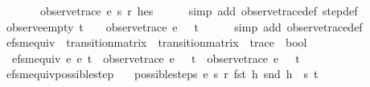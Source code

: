 \begin{isabellebody}
\ \ \ \ \ \ \ observe{\isacharunderscore}trace\ e\ s\ r\ {\isacharparenleft}h{\isacharhash}es{\isacharparenright}\ {\isacharequal}\ {\isacharbrackleft}{\isacharbrackright}{\isachardoublequoteclose}\isanewline
%
\isadelimproof
\ \ %
\endisadelimproof
%
\isatagproof
{}\isamarkupfalse%
\ {\isacharparenleft}simp\ add{\isacharcolon}\ observe{\isacharunderscore}trace{\isacharunderscore}def\ step{\isacharunderscore}def{\isacharparenright}%
\endisatagproof
{\isafoldproof}%
%
\isadelimproof
\isanewline
%
\endisadelimproof
\isanewline
{}\isamarkupfalse%
\ observe{\isacharunderscore}empty{\isacharcolon}\ {\isachardoublequoteopen}t\ {\isacharequal}\ {\isacharbrackleft}{\isacharbrackright}\ {\isasymLongrightarrow}\ observe{\isacharunderscore}trace\ e\ {}\ {\isacharless}{\isachargreater}\ t\ {\isacharequal}\ {\isacharbrackleft}{\isacharbrackright}{\isachardoublequoteclose}\isanewline
%
\isadelimproof
\ \ %
\endisadelimproof
%
\isatagproof
{}\isamarkupfalse%
\ {\isacharparenleft}simp\ add{\isacharcolon}\ observe{\isacharunderscore}trace{\isacharunderscore}def{\isacharparenright}%
\endisatagproof
{\isafoldproof}%
%
\isadelimproof
\isanewline
%
\endisadelimproof
\isanewline
{}\isamarkupfalse%
\ efsm{\isacharunderscore}equiv\ {\isacharcolon}{\isacharcolon}\ {\isachardoublequoteopen}transition{\isacharunderscore}matrix\ {\isasymRightarrow}\ transition{\isacharunderscore}matrix\ {\isasymRightarrow}\ trace\ {\isasymRightarrow}\ bool{\isachardoublequoteclose}\ \isanewline
\ \ {\isachardoublequoteopen}efsm{\isacharunderscore}equiv\ e{}\ e{}\ t\ {\isasymequiv}\ {\isacharparenleft}{\isacharparenleft}observe{\isacharunderscore}trace\ e{}\ {}\ {\isacharless}{\isachargreater}\ t{\isacharparenright}\ {\isacharequal}\ {\isacharparenleft}observe{\isacharunderscore}trace\ e{}\ {}\ {\isacharless}{\isachargreater}\ t{\isacharparenright}{\isacharparenright}{\isachardoublequoteclose}\isanewline
\isanewline
{}\isamarkupfalse%
\ efsm{\isacharunderscore}equiv{\isacharunderscore}possible{\isacharunderscore}step{\isacharcolon}\ \isanewline
\ \ {\isachardoublequoteopen}possible{\isacharunderscore}steps\ e{}\ s{}\ r{}\ {\isacharparenleft}fst\ h{\isacharparenright}\ {\isacharparenleft}snd\ h{\isacharparenright}\ {\isacharequal}\ {\isacharbraceleft}{\isacharbar}{\isacharparenleft}s{}{\isacharprime}{\isacharcomma}\ t{}{\isacharparenright}{\isacharbar}{\isacharbraceright}\ {\isasymLongrightarrow}\isanewline

\end{isabellebody}
